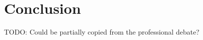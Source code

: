 \chapter{Conclusion}
\label{conclusion}

TODO: Could be partially copied from the professional debate?